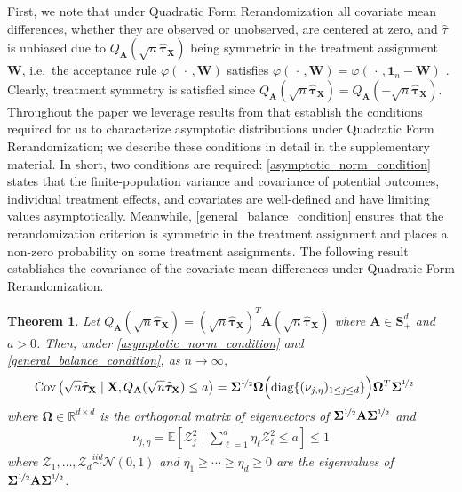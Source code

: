 \documentclass[11pt,twoside]{article}
\newtheorem{theorem}{Theorem}
\theoremstyle{definition}
\theoremstyle{remark}
\begin{document}
First, we note that under Quadratic Form Rerandomization all covariate mean differences, whether they are observed or unobserved, are centered at zero, and $\widehat{\tau}$ is unbiased due to $Q_{\mathbf{A}}(\sqrt{n} \widehat{\bm{\tau}}_{\mathbf{X}})$ being symmetric in the treatment assignment $\mathbf{W}$, i.e.\ the acceptance rule $\varphi(\, \cdot \, , \mathbf{W})$ satisfies $\varphi(\, \cdot \, , \mathbf{W}) = \varphi(\, \cdot \, , \mathbf{1}_n - \mathbf{W})$ \citep{morgan2012rerandomization}. Clearly, treatment symmetry is satisfied since $Q_{\mathbf{A}}(\sqrt{n} \widehat{\bm{\tau}}_{\mathbf{X}}) = Q_{\mathbf{A}}(- \sqrt{n} \widehat{\bm{\tau}}_{\mathbf{X}})$. Throughout the paper we leverage results from \cite{li2018asymptotic} that establish the conditions required for us to characterize asymptotic distributions under Quadratic Form Rerandomization; we describe these conditions in detail in the supplementary material. In short, two conditions are required: \cref{asymptotic_norm_condition} states that the finite-population variance and covariance of potential outcomes, individual treatment effects, and covariates are well-defined and have limiting values asymptotically. Meanwhile, \cref{general_balance_condition} ensures that the rerandomization criterion is symmetric in the treatment assignment and places a non-zero probability on some treatment assignments. The following result establishes the covariance of the covariate mean differences under Quadratic Form Rerandomization.

\newpage 
\begin{theorem}\label{Theorem1}
    Let $Q_{\mathbf{A}}(\sqrt{n} \widehat{\bm{\tau}}_{\mathbf{X}}) = (\sqrt{n} \widehat{\bm{\tau}}_{\mathbf{X}})^T \mathbf{A} (\sqrt{n} \widehat{\bm{\tau}}_{\mathbf{X}})$ where $\mathbf{A} \in \mathbf{S}^d_{+}$ and $a > 0$. Then, under \cref{asymptotic_norm_condition} and \cref{general_balance_condition}, as $n \to \infty$,
\begin{align*}
     \text{Cov}\left(\sqrt{n}\widehat{\bm{\tau}}_{\mathbf{X}} \mid \mathbf{X},  Q_\mathbf{A}(\sqrt{n} \widehat{\bm{\tau}}_{\mathbf{X}}) \leq a\right) &= \mathbf{\Sigma}^{\nicefrac{1}{2}} \mathbf{\Omega} \Big( \text{diag}\{(\nu_{j, \eta})_{1 \leq j \leq d} \} \Big) \mathbf{\Omega}^T \mathbf{\Sigma}^{\nicefrac{1}{2}}
\end{align*}
where $\mathbf{\Omega} \in \mathbb{R}^{d \times d}$ is the orthogonal matrix of eigenvectors of $\mathbf{\Sigma}^{\nicefrac{1}{2}} \mathbf{A} \mathbf{\Sigma}^{\nicefrac{1}{2}}$ and
\begin{align} \label{q_definition}
    \nu_{j,\eta} = \mathbb{E}\left[\mathcal{Z}^2_j \mid  \sum^d_{\ell =1} \eta_\ell \mathcal{Z}^2_\ell \leq a \right] \leq 1
\end{align}
where $\mathcal{Z}_1, \ldots,\mathcal{Z}_d \overset{iid}{\sim} \mathcal{N}(0, 1)$ and $\eta_1 \geq \cdots \geq \eta_d \geq 0$ are the eigenvalues of $\mathbf{\Sigma}^{\nicefrac{1}{2}} \mathbf{A} \mathbf{\Sigma}^{\nicefrac{1}{2}}$. 
\end{theorem}  
\end{document}
